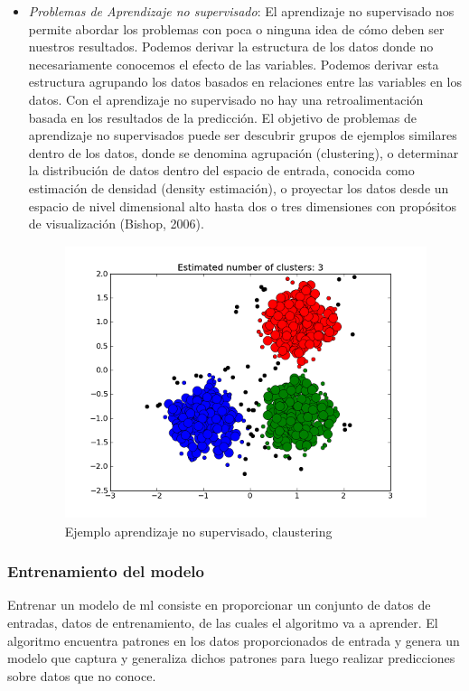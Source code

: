 \begin{itemize}
\item \textit{Problemas de Aprendizaje no supervisado}: El aprendizaje no supervisado nos permite abordar los problemas con
poca o ninguna idea de cómo deben ser nuestros resultados. Podemos derivar la estructura de los datos donde no necesariamente conocemos el efecto de las variables. Podemos derivar esta estructura agrupando los datos basados en relaciones entre las variables en los datos. Con el aprendizaje no supervisado no hay una retroalimentación basada en los resultados de la predicción. El objetivo de problemas de aprendizaje no supervisados puede ser descubrir grupos de ejemplos similares dentro de los datos, donde se denomina agrupación (clustering), o determinar la distribución de datos dentro del espacio de entrada, conocida como estimación de densidad (density estimación), o proyectar los datos desde un espacio de nivel dimensional alto hasta dos o tres dimensiones con propósitos de visualización (Bishop, 2006).

\begin{figure}[H] \centering
  \includegraphics[height=8cm,keepaspectratio=true,clip=true]{imagenes/MarcoTeorico/claustering.png}
  \caption{Ejemplo aprendizaje no supervisado, claustering}\label{Fig:clauster}
\end{figure}
\end{itemize}

\subsubsection{Entrenamiento del modelo}
Entrenar un modelo de \ac{ml} consiste en proporcionar un conjunto de datos de entradas, datos de entrenamiento, de las cuales el algoritmo va a aprender. El algoritmo encuentra patrones en los datos proporcionados de entrada y genera un modelo que captura y generaliza dichos patrones para luego realizar predicciones sobre datos que no conoce.

